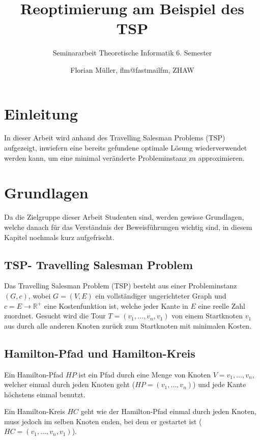 \documentclass[a4paper,11pt]{scrreprt}
\title{Reoptimierung am Beispiel des TSP}
\subtitle{Seminararbeit Theoretische Informatik 6. Semester}
\author{Florian Müller, flm@fastmailfm, ZHAW}
\date{}
\begin{document}
\maketitle

\begin{abstract}
\end{abstract}

\tableofcontents

\chapter{Einleitung}

In dieser Arbeit wird anhand des Travelling Salesman Problems (TSP) aufgezeigt,
inwiefern eine bereits gefundene optimale Lösung wiederverwendet werden kann,
um eine minimal veränderte Probleminstanz zu approximieren. 

\chapter{Grundlagen}

Da die Zielgruppe dieser Arbeit Studenten sind, werden gewisse Grundlagen, welche danach für das Verständnis der Beweisführungen wichtig sind, in diesem Kapitel nochmals kurz aufgefrischt.

\section{TSP- Travelling Salesman Problem}

Das Travelling Salesman Problem (TSP) besteht aus einer Probleminstanz $(G, c)$,
wobei $G = (V, E)$ ein vollständiger ungerichteter Graph und $c = E \rightarrow \mathbb{R}^+$ eine Kostenfunktion ist, welche jeder Kante in $E$ eine reelle Zahl
zuordnet. Gesucht wird die Tour $T = (v_1, \dots, v_n, v_1)$ von einem
Startknoten $v_1$ aus durch alle anderen Knoten zurück zum Startknoten mit minimalen Kosten. 

\section{Hamilton-Pfad und Hamilton-Kreis}

Ein Hamilton-Pfad $HP$ ist ein Pfad durch eine Menge von Knoten $V = {v_1, \dots, v_n}$, welcher einmal durch jeden Knoten geht ($HP = (v_1, \dots, v_n)$) und jede Kante höchstens einmal benutzt.

Ein Hamilton-Kreis $HC$ geht wie der Hamilton-Pfad einmal durch jeden Knoten, muss jedoch im selben Knoten enden, bei dem er gestartet ist ($HC = (v_1, \dots, v_n, v_1)$).
\end{document}
